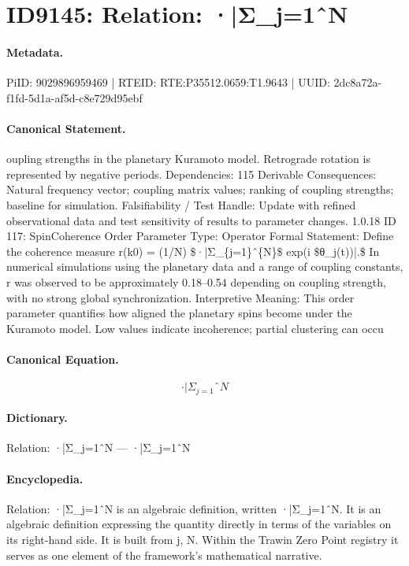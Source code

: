 \section*{ID9145: Relation: ·|Σ\_j=1ˆN}
\paragraph{Metadata.}
PiID: 9029896959469 | RTEID: RTE:P35512.0659:T1.9643 | UUID: 2dc8a72a-f1fd-5d1a-af5d-c8e729d95ebf

\paragraph{Canonical Statement.}
oupling strengths in the planetary Kuramoto model. Retrograde rotation is represented by negative periods. Dependencies: 115 Derivable Consequences: Natural frequency vector; coupling matrix values; ranking of coupling strengths; baseline for simulation. Falsifiability / Test Handle: Update with refined observational data and test sensitivity of results to parameter changes. 1.0.18 ID 117: SpinCoherence Order Parameter Type: Operator Formal Statement: Define the coherence measure r(k0) = (1/N) \$·|Σ\_\{j=1\}ˆ\{N\}\$ exp(i \$θ\_j(t))|.\$ In numerical simulations using the planetary data and a range of coupling constants, r was observed to be approximately 0.18–0.54 depending on coupling strength, with no strong global synchronization. Interpretive Meaning: This order parameter quantifies how aligned the planetary spins become under the Kuramoto model. Low values indicate incoherence; partial clustering can occu

\paragraph{Canonical Equation.}
\[
·|Σ_{j=1}ˆ{N}
\]

\paragraph{Dictionary.}
Relation: ·|Σ\_j=1ˆN — ·|Σ\_j=1ˆN

\paragraph{Encyclopedia.}
Relation: ·|Σ\_j=1ˆN is an algebraic definition, written ·|Σ\_j=1ˆN. It is an algebraic definition expressing the quantity directly in terms of the variables on its right-hand side. It is built from j, N. Within the Trawin Zero Point registry it serves as one element of the framework's mathematical narrative.
